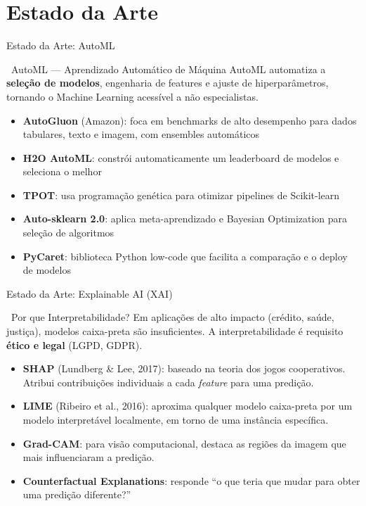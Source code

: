 \documentclass[aspectratio=169]{beamer}
\begin{document}
\section{Estado da Arte}

\begin{frame}{Estado da Arte: AutoML}
    \begin{block}{\faCogs\ AutoML --- Aprendizado Automático de Máquina}
        AutoML automatiza a \textbf{seleção de modelos}, engenharia de features e ajuste de hiperparâmetros, tornando o Machine Learning acessível a não especialistas.
    \end{block}
    \vspace{0.2cm}
    \begin{itemize}
        \item \textbf{AutoGluon} (Amazon): foca em benchmarks de alto desempenho para dados tabulares, texto e imagem, com ensembles automáticos
        \item \textbf{H2O AutoML}: constrói automaticamente um leaderboard de modelos e seleciona o melhor
        \item \textbf{TPOT}: usa programação genética para otimizar pipelines de Scikit-learn
        \item \textbf{Auto-sklearn 2.0}: aplica meta-aprendizado e Bayesian Optimization para seleção de algoritmos
        \item \textbf{PyCaret}: biblioteca Python low-code que facilita a comparação e o deploy de modelos
    \end{itemize}
\end{frame}

\begin{frame}{Estado da Arte: Explainable AI (XAI)}
    \begin{block}{\faEye\ Por que Interpretabilidade?}
        Em aplicações de alto impacto (crédito, saúde, justiça), modelos caixa-preta são insuficientes. A interpretabilidade é requisito \textbf{ético e legal} (LGPD, GDPR).
    \end{block}
    \vspace{0.2cm}
    \begin{itemize}
        \item \textbf{SHAP} (Lundberg \& Lee, 2017): baseado na teoria dos jogos cooperativos. Atribui contribuições individuais a cada \textit{feature} para uma predição. 
        \item \textbf{LIME} (Ribeiro et al., 2016): aproxima qualquer modelo caixa-preta por um modelo interpretável localmente, em torno de uma instância específica.
        \item \textbf{Grad-CAM}: para visão computacional, destaca as regiões da imagem que mais influenciaram a predição.
        \item \textbf{Counterfactual Explanations}: responde ``o que teria que mudar para obter uma predição diferente?''
    \end{itemize}
\end{frame}
\end{document}
